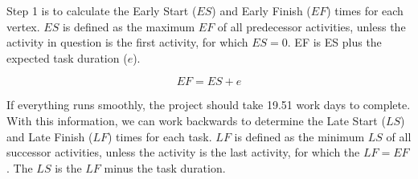 Step 1 is to calculate the Early Start ($ES$) and Early Finish ($EF$) times for each vertex. $ES$ is defined as the maximum $EF$ of all predecessor activities, unless the activity in question is the first activity, for which $ES=0$. EF is ES plus the expected task duration ($e$).

\begin{equation}
  EF = ES + e
\end{equation}

If everything runs smoothly, the project should take 19.51 work days to complete. With this information, we can work backwards to determine the Late Start ($LS$) and Late Finish ($LF$) times for each task. $LF$ is defined as the minimum $LS$ of all successor activities, unless the activity is the last activity, for which the $LF=EF$. The $LS$ is the $LF$ minus the task duration.

